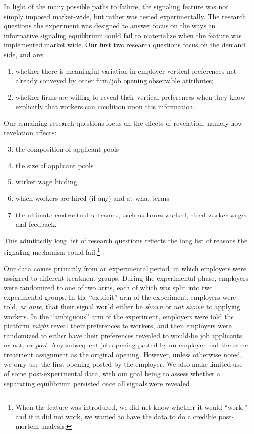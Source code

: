 In light of the many possible paths to failure, the signaling feature was not simply imposed market-wide, but rather was tested experimentally. 
The research questions the experiment was designed to answer focus on the ways an informative signaling equilibrium could fail to materialize when the feature was implemented market wide. 
Our first two research questions focus on the demand side, and are:
\begin{enumerate}
    \item whether there is meaningful variation in employer vertical
      preferences not already conveyed by other firm/job opening
      observable attributes; \label{q1}
    \item whether firms are willing to reveal their vertical
      preferences when they know explicitly that workers can condition
      upon this information. \label{q2}
\end{enumerate}     
Our remaining research questions focus on the effects of revelation, namely how revelation affects: 
\begin{enumerate}
  \setcounter{enumi}{2}
\item the composition of applicant pools \label{q3}
\item the size of applicant pools \label{q4}
\item worker wage bidding \label{q5}
\item which workers are hired (if any) and at what terms \label{q6}
\item the ultimate contractual outcomes, such as hours-worked, hired
    worker wages and feedback.\label{q7}
\end{enumerate} 
This admittedly long list of research questions reflects the long list of reasons the signaling mechanism could fail.\footnote{ 
When the feature was introduced, we did not know whether it would ``work,'' and if it did not work, we wanted to have the data to do a credible post-mortem analysis. 
}

Our data comes primarily from an experimental period, in which employers were assigned to different treatment groups.
During the experimental phase, employers were randomized to one of two  arms,  each of which was split into two experimental groups. 
In the ``explicit'' arm of the experiment, employers were told, \emph{ex ante}, that their signal would either be \emph{shown} or \emph{not shown} to applying workers. 
In the ``ambiguous'' arm of the experiment, employers were told the platform \emph{might} reveal their preferences to workers, and then employers were randomized to either have their preferences revealed to would-be job applicants or not, \emph{ex post}.
Any subsequent job opening posted by an employer had the same treatment assignment as the original opening.
However, unless otherwise noted, we only use the first opening posted by the employer. 
We also make limited use of some post-experimental data, with our goal being to assess whether a separating equilibrium persisted once all signals were revealed. 

